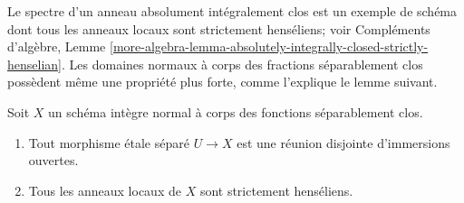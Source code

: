 \noindent
Le spectre d'un anneau absolument intégralement clos
est un exemple de schéma dont tous les anneaux locaux sont
strictement henséliens; voir Compléments d'algèbre, Lemme
\ref{more-algebra-lemma-absolutely-integrally-closed-strictly-henselian}.
Les domaines normaux à corps des fractions séparablement clos
possèdent même une propriété plus forte, comme l'explique le
lemme suivant.

\begin{lemma}
\label{lemma-normal-scheme-with-alg-closed-function-field}
Soit $X$ un schéma intègre normal à corps des fonctions
séparablement clos.
\begin{enumerate}
\item Tout morphisme étale séparé $U \to X$ est une
réunion disjointe d'immersions ouvertes.
\item Tous les anneaux locaux de $X$ sont strictement henséliens.
\end{enumerate}
\end{lemma}

